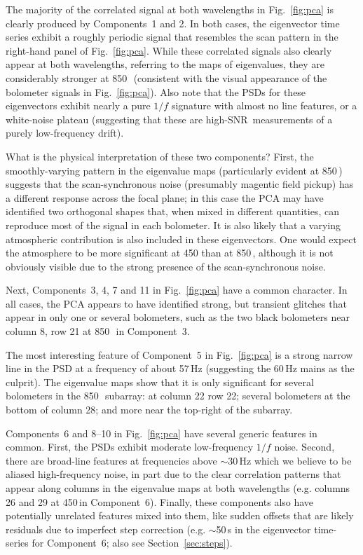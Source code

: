\documentclass[useAMS,usenatbib,nofootinbib]{mn2e}
\newcommand{\snr}{SNR}
\begin{document}
The majority of the correlated signal at both wavelengths in
Fig.~\ref{fig:pca} is clearly produced by Components~1 and 2. In both
cases, the eigenvector time series exhibit a roughly periodic signal
that resembles the scan pattern in the right-hand panel of
Fig.~\ref{fig:pca}. While these correlated signals also clearly appear
at both wavelengths, referring to the maps of eigenvalues, they are
considerably stronger at 850\,\micron\ (consistent with the visual
appearance of the bolometer signals in Fig.~\ref{fig:pca}). Also note
that the PSDs for these eigenvectors exhibit nearly a pure $1/f$
signature with almost no line features, or a white-noise plateau
(suggesting that these are high-\snr\ measurements of a purely
low-frequency drift).

What is the physical interpretation of these two components? First,
the smoothly-varying pattern in the eigenvalue maps (particularly
evident at 850\,\micron) suggests that the scan-synchronous noise
(presumably magentic field pickup) has a different response across the
focal plane; in this case the PCA may have identified two orthogonal
shapes that, when mixed in different quantities, can reproduce most of
the signal in each bolometer. It is also likely that a varying
atmospheric contribution is also included in these eigenvectors. One
would expect the atmosphere to be more significant at 450 than at
850\,\micron, although it is not obviously visible due to the strong
presence of the scan-synchronous noise.

Next, Components~3, 4, 7 and 11 in Fig.~\ref{fig:pca} have a common
character. In all cases, the PCA appears to have identified strong,
but transient glitches that appear in only one or several bolometers,
such as the two black bolometers near column 8, row 21 at
850\,\micron\ in Component~3.

The most interesting feature of Component~5 in Fig.~\ref{fig:pca} is a
strong narrow line in the PSD at a frequency of about 57\,Hz
(suggesting the 60\,Hz mains as the culprit). The eigenvalue maps show
that it is only significant for several bolometers in the
850\,\micron\ subarray: at column 22 row 22; several bolometers at the
bottom of column 28; and more near the top-right of the subarray.

Components~6 and 8--10 in Fig.~\ref{fig:pca} have several generic
features in common. First, the PSDs exhibit moderate low-frequency
$1/f$ noise. Second, there are broad-line features at frequencies
above $\sim$30\,Hz which we believe to be aliased high-frequency
noise, in part due to the clear correlation patterns that appear along
columns in the eigenvalue maps at both wavelengths (e.g. columns 26
and 29 at 450\,\micron in Component~6). Finally, these components also
have potentially unrelated features mixed into them, like sudden
offsets that are likely residuals due to imperfect step correction
(e.g. $\sim$50\,s in the eigenvector time-series for Component~6; also
see Section~\ref{sec:steps}).
\end{document}
